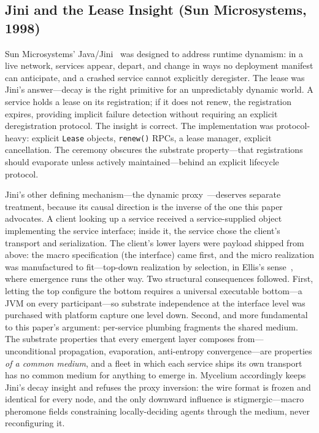 \documentclass[11pt]{article}
\begin{document}
\subsection{Jini and the Lease Insight (Sun Microsystems, 1998)}

Sun Microsystems' Java/Jini~\cite{jini-arch,jini-spec} was designed to address
runtime dynamism: in a live network, services appear, depart, and change in ways
no deployment manifest can anticipate, and a crashed service cannot explicitly
deregister. The lease was Jini's answer---decay is the right primitive for an
unpredictably dynamic world. A service holds a lease on its registration; if it
does not renew, the registration expires, providing implicit failure detection
without requiring an explicit deregistration protocol. The insight is correct.
The implementation was protocol-heavy: explicit \texttt{Lease} objects,
\texttt{renew()} RPCs, a lease manager, explicit cancellation. The ceremony
obscures the substrate property---that registrations should evaporate unless
actively maintained---behind an explicit lifecycle protocol.

Jini's other defining mechanism---the dynamic proxy~\cite{jini-arch}---deserves
separate treatment, because its causal direction is the inverse of the one this
paper advocates. A client looking up a service received a service-supplied
object implementing the service interface; inside it, the service chose the
client's transport and serialization. The client's lower layers were payload
shipped from above: the macro specification (the interface) came first, and the
micro realization was manufactured to fit---top-down realization by selection,
in Ellis's sense~\cite{ellis}, where emergence runs the other way. Two
structural consequences followed. First, letting the top configure the bottom
requires a universal executable bottom---a JVM on every participant---so
substrate independence at the interface level was purchased with platform
capture one level down. Second, and more fundamental to this paper's argument:
per-service plumbing fragments the shared medium. The substrate properties that
every emergent layer composes from---unconditional propagation, evaporation,
anti-entropy convergence---are properties \emph{of a common medium}, and a
fleet in which each service ships its own transport has no common medium for
anything to emerge in. Mycelium accordingly keeps Jini's decay insight and
refuses the proxy inversion: the wire format is frozen and identical for every
node, and the only downward influence is stigmergic---macro pheromone fields
constraining locally-deciding agents through the medium, never reconfiguring it.
\end{document}
